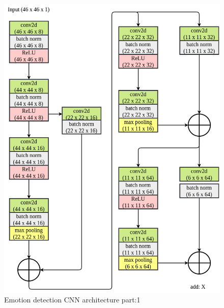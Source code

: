 \begin{figure}[h]
\centering
\includegraphics[width=1.0\textwidth]{images/emotion_arch_1.png}
\caption{Emotion detection CNN architecture part:1}
\label{fig:emotion_arch_1}
\end{figure}
\clearpage
